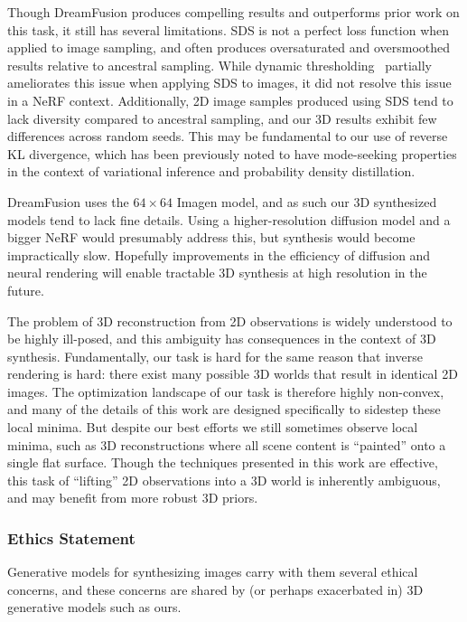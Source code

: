 \documentclass{article} %
\newcommand{\sacc}{SDS\xspace}
\newcommand{\dreamfusion}{DreamFusion\xspace}
\begin{document}
Though \dreamfusion{} produces compelling results and outperforms prior work on this task, it still has several limitations.
\sacc is not a perfect loss function when applied to image sampling, and often produces oversaturated and oversmoothed results relative to ancestral sampling.
While dynamic thresholding~\citep{imagen} partially ameliorates this issue when applying \sacc to images, it did not resolve this issue in a NeRF context.
Additionally, 2D image samples produced using \sacc tend to lack diversity compared to ancestral sampling, and our 3D results exhibit few differences across random seeds.
This may be fundamental to our use of reverse KL divergence, which has been previously noted to have mode-seeking properties in the context of variational inference and probability density distillation.

\dreamfusion uses the $64\times64$ Imagen model, and as such our 3D synthesized models tend to lack fine details. Using a higher-resolution diffusion model and a bigger NeRF would presumably address this, but synthesis would become impractically slow. Hopefully improvements in the efficiency of diffusion and neural rendering will enable tractable 3D synthesis at high resolution in the future.

The problem of 3D reconstruction from 2D observations is widely understood to be highly ill-posed, and this ambiguity has consequences in the context of 3D synthesis. Fundamentally, our task is hard for the same reason that inverse rendering is hard: there exist many possible 3D worlds that result in identical 2D images.
The optimization landscape of our task is therefore highly non-convex, and many of the details of this work are designed specifically to sidestep these local minima. But despite our best efforts we still sometimes observe local minima, such as 3D reconstructions where all scene content is ``painted'' onto a single flat surface. Though the techniques presented in this work are effective, this task of ``lifting'' 2D observations into a 3D world is inherently ambiguous, and may benefit from more robust 3D priors.%



\clearpage
\subsubsection*{Ethics Statement}


Generative models for synthesizing images carry with them several ethical concerns, and these concerns are shared by (or perhaps exacerbated in) 3D generative models such as ours.
\end{document}
